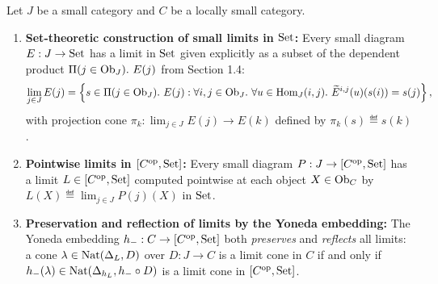 \documentclass[10pt,a4paper]{article}
\begin{document}
\begin{theorem}\label{thm:yoneda_limits}
Let $J$ be a small category and $C$ be a locally small category.
\begin{enumerate}
\item \textbf{Set-theoretic construction of small limits in ${\textrm{Set}}$:} Every small diagram $E : J \to {\textrm{Set}}$ has a limit in ${\textrm{Set}}$ given explicitly as a subset of the dependent product $\Pi(j \in \Ob_J).\ E(j)$ from Section 1.4:
$$\lim_{j \in J} E(j) = \left\{ s \in \Pi(j \in {\textrm{Ob}}_J).\ E(j) : \forall i, j \in {\textrm{Ob}}_J.\ \forall u \in {\textrm{Hom}}_J(i, j).\ \widetilde{E}^{i,j}(u)(s(i)) = s(j) \right\},$$
with projection cone $\pi_k : \lim_{j \in J} E(j) \to E(k)$ defined by $\pi_k(s) \eqdef s(k)$.
\item \textbf{Pointwise limits in $[C^{\textrm{op}}, {\textrm{Set}}]$:} Every small diagram $P : J \to [C^{\textrm{op}}, {\textrm{Set}}]$ has a limit $L \in [C^{\textrm{op}}, {\textrm{Set}}]$ computed pointwise at each object $X \in {\textrm{Ob}}_C$ by $L(X) \eqdef \lim_{j \in J} P(j)(X)$ in ${\textrm{Set}}$.
\item \textbf{Preservation and reflection of limits by the Yoneda embedding:} The Yoneda embedding $h_- : C \to [C^{\textrm{op}}, {\textrm{Set}}]$ both \emph{preserves} and \emph{reflects} all limits: a cone $\lambda \in {\textrm{Nat}}(\Delta_L, D)$ over $D : J \to C$ is a limit cone in $C$ if and only if $h_-(\lambda) \in {\textrm{Nat}}(\Delta_{h_L}, h_- \circ D)$ is a limit cone in $[C^{\textrm{op}}, {\textrm{Set}}]$.
\end{enumerate}
\end{theorem}
\myprf
\end{document}
